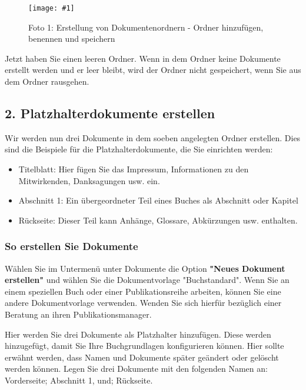 \documentclass{article}
\newlength{\imgwidth}
\newcommand\scaledgraphics[2]{%
                
\settowidth{\imgwidth}{\texttt{[image: \#1]}}%
                
\setlength{\imgwidth}{\minof{\imgwidth}{#2\textwidth}}%
                
\texttt{[image: \#1]}%
                
}
\begin{document}
\begin{figure}
\scaledgraphics{04d64821-e590-4586-bdb7-8057ed52a4a0.png}{1}
\caption*{Foto 1: Erstellung von Dokumentenordnern - Ordner hinzufügen, benennen und speichern}\label{F97885011}
\end{figure}


Jetzt haben Sie einen leeren Ordner. Wenn in dem Ordner keine Dokumente erstellt werden und er leer bleibt, wird der Ordner nicht gespeichert, wenn Sie aus dem Ordner rausgehen.


\subsection{2. Platzhalterdokumente erstellen}\label{H4781105}



Wir werden nun drei Dokumente in dem soeben angelegten Ordner erstellen. Dies sind die Beispiele für die Platzhalterdokumente, die Sie einrichten werden:

\begin{itemize}
\item Titelblatt: Hier fügen Sie das Impressum, Informationen zu den Mitwirkenden, Danksagungen usw. ein.


\item Abschnitt 1: Ein übergeordneter Teil eines Buches als Abschnitt oder Kapitel


\item Rückseite: Dieser Teil kann Anhänge, Glossare, Abkürzungen usw. enthalten.


\end{itemize}

\subsubsection{So erstellen Sie Dokumente}\label{H5646695}



Wählen Sie im Untermenü unter Dokumente die Option \textbf{"Neues Dokument erstellen"} und wählen Sie die Dokumentvorlage "Buchstandard". Wenn Sie an einem speziellen Buch oder einer Publikationsreihe arbeiten, können Sie eine andere Dokumentvorlage verwenden. Wenden Sie sich hierfür bezüglich einer Beratung an ihren Publikationsmanager.


Hier werden Sie drei Dokumente als Platzhalter hinzufügen. Diese werden hinzugefügt, damit Sie Ihre Buchgrundlagen konfigurieren können. Hier sollte erwähnt werden, dass Namen und Dokumente später geändert oder gelöscht werden können. Legen Sie drei Dokumente mit den folgenden Namen an: Vorderseite; Abschnitt 1, und; Rückseite.
\end{document}

